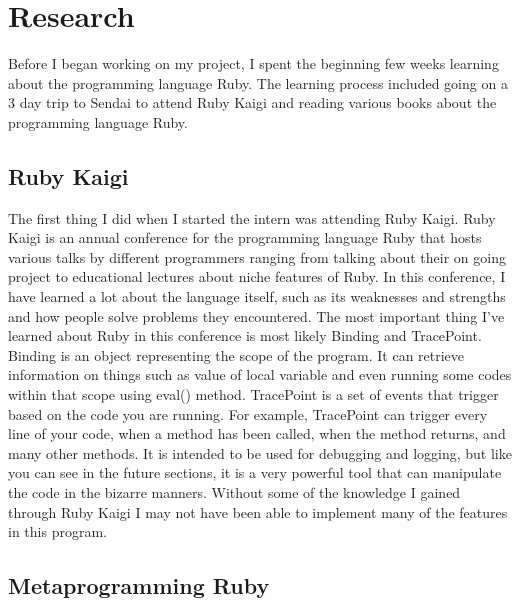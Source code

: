 \section{Research}

Before I began working on my project, I spent the beginning few weeks learning about the programming language Ruby.  The learning process included going on a 3 day trip to Sendai to attend Ruby Kaigi and reading various books about the programming language Ruby.

\subsection{Ruby Kaigi}

The first thing I did when I started the intern was attending Ruby Kaigi.  Ruby Kaigi is an annual conference for the programming language Ruby that hosts various talks by different programmers ranging from talking about their on going project to educational lectures about niche features of Ruby.  In this conference, I have learned a lot about the language itself, such as its weaknesses and strengths and how people solve problems they encountered.  The most important thing I've learned about Ruby in this conference is most likely Binding and TracePoint.  Binding is an object representing the scope of the program.  It can retrieve information on things such as value of local variable and even running some codes within that scope using eval() method.  TracePoint is a set of events that trigger based on the code you are running.  For example, TracePoint can trigger every line of your code, when a method has been called, when the method returns, and many other methods.  It is intended to be used for debugging and logging, but like you can see in the future sections, it is a very powerful tool that can manipulate the code in the bizarre manners.  Without some of the knowledge I gained through Ruby Kaigi I may not have been able to implement many of the features in this program.

\subsection{Metaprogramming Ruby}

